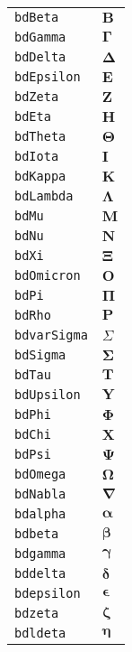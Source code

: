 \begin{longtable}{ll}
\texttt{bdBeta}&${}\boldsymbol{B} {}$\\
\texttt{bdGamma}&${}\boldsymbol{\Gamma} {}$\\
\texttt{bdDelta}&${}\boldsymbol{\Delta} {}$\\
\texttt{bdEpsilon}&${}\boldsymbol{E} {}$\\
\texttt{bdZeta}&${}\boldsymbol{Z} {}$\\
\texttt{bdEta}&${}\boldsymbol{H} {}$\\
\texttt{bdTheta}&${}\boldsymbol{\Theta} {}$\\
\texttt{bdIota}&${}\boldsymbol{I} {}$\\
\texttt{bdKappa}&${}\boldsymbol{K} {}$\\
\texttt{bdLambda}&${}\boldsymbol{\Lambda} {}$\\
\texttt{bdMu}&${}\boldsymbol{M} {}$\\
\texttt{bdNu}&${}\boldsymbol{N} {}$\\
\texttt{bdXi}&${}\boldsymbol{\Xi} {}$\\
\texttt{bdOmicron}&${}\boldsymbol{O} {}$\\
\texttt{bdPi}&${}\boldsymbol{\Pi} {}$\\
\texttt{bdRho}&${}\boldsymbol{P} {}$\\
\texttt{bdvarSigma}&${}\boldsymbol{\varSigma} {}$\\
\texttt{bdSigma}&${}\boldsymbol{\Sigma} {}$\\
\texttt{bdTau}&${}\boldsymbol{T} {}$\\
\texttt{bdUpsilon}&${}\boldsymbol{Y} {}$\\
\texttt{bdPhi}&${}\boldsymbol{\Phi} {}$\\
\texttt{bdChi}&${}\boldsymbol{X} {}$\\
\texttt{bdPsi}&${}\boldsymbol{\Psi} {}$\\
\texttt{bdOmega}&${}\boldsymbol{\Omega} {}$\\
\texttt{bdNabla}&${}\boldsymbol{\nabla} {}$\\
\texttt{bdalpha}&${}\boldsymbol{\alpha} {}$\\
\texttt{bdbeta}&${}\boldsymbol{\beta} {}$\\
\texttt{bdgamma}&${}\boldsymbol{\gamma} {}$\\
\texttt{bddelta}&${}\boldsymbol{\delta} {}$\\
\texttt{bdepsilon}&${}\boldsymbol{\epsilon} {}$\\
\texttt{bdzeta}&${}\boldsymbol{\zeta} {}$\\
\texttt{bdldeta}&${}\boldsymbol{\eta} {}$\\

\end{longtable}
